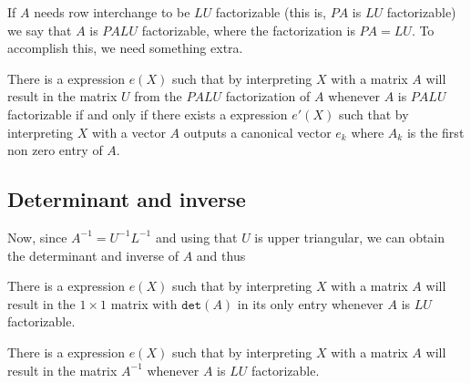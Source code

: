 %
%


If $A$ needs row interchange to be $LU$ factorizable (this is, $PA$ is $LU$ factorizable) we say that $A$ is $PALU$ factorizable, where the factorization is $PA=LU$. To accomplish this, we need something extra.

 \begin{proposition}\label{prop:palu}
There is a \langfor expression $e(X)$ such that by interpreting $X$ with a matrix $A$ will result in the matrix $U$ from the $PALU$ factorization of $A$ whenever $A$ is $PALU$ factorizable if and only if there exists a \langfor expression $e'(X)$ such that by interpreting $X$ with a vector $A$ outputs a canonical vector $e_k$ where $A_k$ is the first non zero entry of $A$.
\end{proposition}




\subsection{Determinant and inverse}

Now, since $A^{-1}=U^{-1}L^{-1}$ and using that $U$ is upper triangular, we can obtain the determinant and inverse of $A$ and thus


 \begin{proposition}\label{prop:determinant}
There is a \langfor expression $e(X)$ such that by interpreting $X$ with a matrix $A$ will result in the $1\times 1$ matrix with $\texttt{det}(A)$ in its only entry whenever $A$ is $LU$ factorizable.
\end{proposition}

\begin{proposition}\label{prop:inverse}
There is a \langfor expression $e(X)$ such that by interpreting $X$ with a matrix $A$ will result in the matrix $A^{-1}$ whenever $A$ is $LU$ factorizable.
\end{proposition}

